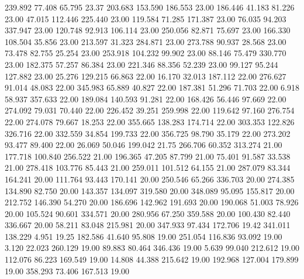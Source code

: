  239.892   77.408   65.795        23.37
 203.683  153.590  186.553        23.00
 186.446   41.183   81.226        23.00
  47.015  112.446  225.440        23.00
 119.584   71.285  171.387        23.00
  76.035   94.203  337.947        23.00
 120.748   92.913  106.114        23.00
 250.056   82.871   75.697        23.00
 166.330  108.504   35.856        23.00
 213.597   31.323  284.871        23.00
 273.788   90.937   28.568        23.00
  73.478   82.755   25.254        23.00
 253.918  104.232   99.902        23.00
  88.146   75.479  330.770        23.00
 182.375   57.257   86.384        23.00
 221.346   88.356   52.239        23.00
  99.127   95.244  127.882        23.00
  25.276  129.215   66.863        22.00
  16.170   32.013  187.112        22.00
 276.627   91.014   48.083        22.00
 345.983   65.889   40.827        22.00
 187.381   51.296   71.703        22.00
   6.918   58.937  357.633        22.00
 189.084  140.593   91.281        22.00
 168.426   56.446   97.669        22.00
 274.092   79.031   70.440        22.00
 226.452   39.251  259.998        22.00
 119.642   97.160  276.754        22.00
 274.078   79.667   18.253        22.00
 355.665  138.283  174.714        22.00
 303.353  122.826  326.716        22.00
 332.559   34.854  199.733        22.00
 356.725   98.790   35.179        22.00
 273.202   93.477   89.400        22.00
  26.069   50.046  199.042        21.75
 266.706   60.352  313.274        21.00
 177.718  100.840  256.522        21.00
 196.365   47.205   87.799        21.00
  75.401   91.587   33.538        21.00
 278.418  103.776   85.443        21.00
 259.011  101.512   64.155        21.00
 287.079   83.344  164.241        20.00
 111.764   93.443  170.141        20.00
 250.546   65.266  336.703        20.00
 274.385  134.890   82.750        20.00
 143.357  134.097  319.580        20.00
 348.089   95.095  155.817        20.00
 212.752  146.390   54.270        20.00
 186.696  142.962  191.693        20.00
 190.068   51.003   78.926        20.00
 105.524   90.601  334.571        20.00
 280.956   67.250  359.588        20.00
 100.430   82.440  336.667        20.00
  58.211   83.048  215.981        20.00
 347.933   97.434  172.706        19.42
 341.011  138.229    4.951        19.25
 182.586   41.640   95.808        19.00
 251.054  116.836   93.092        19.00
   3.120   22.023  260.129        19.00
  89.883   80.464  346.436        19.00
   5.639   99.040  212.612        19.00
 112.076   86.223  169.549        19.00
  14.808   44.388  215.642        19.00
 192.968  127.004  179.899        19.00
 358.293   73.406  167.513        19.00
